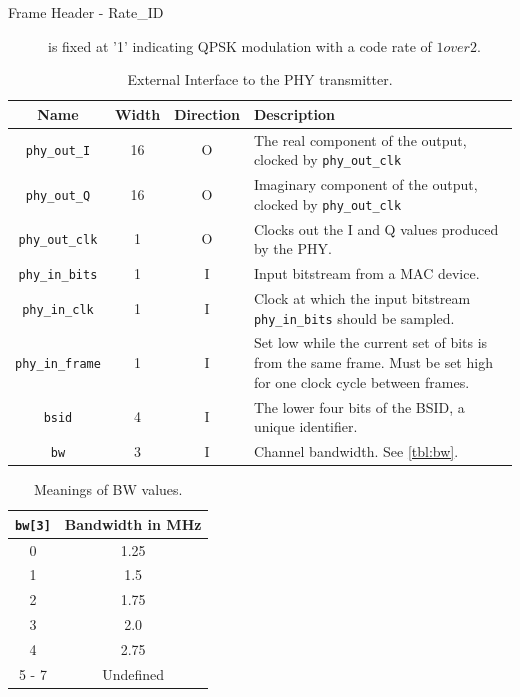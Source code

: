 \documentclass[dvips,10pt,twocolumn]{article}
\newcommand{\wire}{\texttt}
\begin{document}
\begin{description}
	\item[Frame Header - Rate\_ID] is fixed at '1' indicating QPSK
		modulation with a code rate of $1 over 2$.
	

\end{description}

\begin{table} \begin{tabularx}{\linewidth}{c|c|c|X}
	\label{tbl:extern-io}
	Name & Width & Direction & Description\\ \hline

	\wire{phy\_out\_I} & 16 & O & The real component of the output,
	clocked by \wire{phy\_out\_clk} \\

	\wire{phy\_out\_Q} & 16 & O & Imaginary component of the output,
	clocked by \wire{phy\_out\_clk} \\

	\wire{phy\_out\_clk} & 1 & O & Clocks out the I and Q values
	produced by the PHY. \\

	\wire{phy\_in\_bits} & 1 & I & Input bitstream from a MAC
	device. \\

	\wire{phy\_in\_clk} & 1 & I & Clock at which the input bitstream
	\wire{phy\_in\_bits} should be sampled. \\

	\wire{phy\_in\_frame} & 1 & I & Set low while the current set of
	bits is from the same frame. Must be set high for one clock cycle
	between frames. \\

	\wire{bsid} & 4 & I & The lower four bits of the BSID, a unique
	identifier. \\
	
	\wire{bw} & 3 & I & Channel bandwidth. See \autoref{tbl:bw}. \\
\end{tabularx}
\caption{External Interface to the PHY transmitter.}
\end{table}

\begin{table} \begin{center} \begin{tabular}{c|c}
	\label{tbl:bw}
	
	\wire{bw[3]} & Bandwidth in MHz \\ \hline

	0 & 1.25 \\
	1 & 1.5  \\
	2 & 1.75 \\
	3 & 2.0  \\
	4 & 2.75 \\
	5 - 7 & Undefined

\end{tabular} \end{center} \caption{Meanings of BW values.} \end{table}
\end{document}
